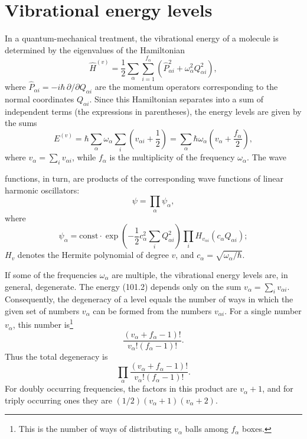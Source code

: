 \section{Vibrational energy levels}

In a quantum-mechanical treatment, the vibrational energy of a molecule is determined by the eigenvalues of the Hamiltonian
\begin{equation}
 \widehat H^{(v)}=\frac12\sum_\alpha\sum_{i=1}^{f_\alpha}
 \left(\widehat P_{\alpha i}^{2}+\omega_\alpha^2Q_{\alpha i}^2\right),
 \tag{101.1}
\end{equation}
where $\widehat P_{\alpha i}=-i\hbar\,\partial/\partial Q_{\alpha i}$ are the momentum operators corresponding to the normal coordinates $Q_{\alpha i}$. Since this Hamiltonian separates into a sum of independent terms (the expressions in parentheses), the energy levels are given by the sums
\begin{equation}
 E^{(v)}=\hbar\sum_\alpha\omega_\alpha\sum_i\left(v_{\alpha i}+\frac12\right)
 =\sum_\alpha\hbar\omega_\alpha\left(v_\alpha+\frac{f_\alpha}{2}\right),
 \tag{101.2}
\end{equation}
where $v_\alpha=\sum_i v_{\alpha i}$, while $f_\alpha$ is the multiplicity of the frequency $\omega_\alpha$. The wave

functions, in turn, are products of the corresponding wave functions of linear harmonic oscillators:
\begin{equation}
 \psi=\prod_\alpha\psi_\alpha,
 \tag{101.3}
\end{equation}
where
\begin{equation}
 \psi_\alpha=\mathrm{const}\cdot\exp\left(-\frac12c_\alpha^2\sum_iQ_{\alpha i}^2\right)
 \prod_iH_{v_{\alpha i}}(c_\alpha Q_{\alpha i});
 \tag{101.4}
\end{equation}
$H_v$ denotes the Hermite polynomial of degree $v$, and $c_\alpha=\sqrt{\omega_\alpha/\hbar}$.

If some of the frequencies $\omega_\alpha$ are multiple, the vibrational energy levels are, in general, degenerate. The energy (101.2) depends only on the sum $v_\alpha=\sum_i v_{\alpha i}$. Consequently, the degeneracy of a level equals the number of ways in which the given set of numbers $v_\alpha$ can be formed from the numbers $v_{\alpha i}$. For a single number $v_\alpha$, this number is\footnote{This is the number of ways of distributing $v_\alpha$ balls among $f_\alpha$ boxes.}
\[
 \frac{(v_\alpha+f_\alpha-1)!}{v_\alpha!(f_\alpha-1)!}.
\]
Thus the total degeneracy is
\begin{equation}
 \prod_\alpha\frac{(v_\alpha+f_\alpha-1)!}{v_\alpha!(f_\alpha-1)!}.
 \tag{101.5}
\end{equation}
For doubly occurring frequencies, the factors in this product are $v_\alpha+1$, and for triply occurring ones they are $(1/2)(v_\alpha+1)(v_\alpha+2)$.

